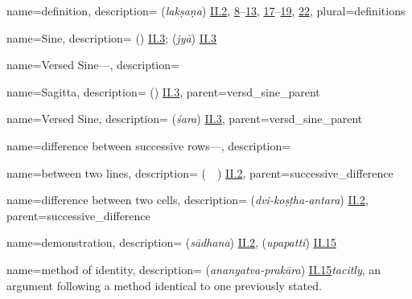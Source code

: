 {
        name={definition},
        description={ (\textit{lakṣaṇa}) \hyperlink{Sii2}{II.2}, \hyperlink{Sii8}{8}--\hyperlink{Sii13}{13}, \hyperlink{Sii17}{17}--\hyperlink{Sii19}{19}, \hyperlink{Sii22}{22}},
        plural={definitions}
}


{
        name={Sine},
        description={ (\jayb) \hyperlink{Pii3}{II.3};  (\textit{jyā}) \hyperlink{Sii3}{II.3}}
}

{
        name={Versed Sine---},
        description={\phantom{x}\nopagebreak}
}

{
        name={Sagitta},
        description={ (\sahm) \hyperlink{Pii3}{II.3}},
        parent={versd_sine_parent}
} 

{
        name={Versed Sine},
        description={ (\textit{śara}) \hyperlink{Sii3}{II.3}},
        parent={versd_sine_parent}
}


{
        name={difference between successive rows---},
        description={\phantom{x}\nopagebreak}
}
  
{
        name={between two lines},
        description={ (\ma\ \bayn\ \alsatrayn) \hyperlink{Pii2}{II.2}},
        parent={successive_difference}
}

{
        name={difference between two cells},
        description={ (\textit{dvi-koṣṭha-antara}) \hyperlink{Sii2}{II.2}},
        parent={successive_difference}
}        

{
        name={demonstration},
        description={ (\textit{sādhana}) \hyperlink{Sii2}{II.2},  (\textit{upapatti}) \hyperlink{Sii15}{II.15}}
}

{
        name={method of identity},
        description={ (\textit{ananyatva-prakāra}) \hyperlink{Sii15}{II.15}\newline \textit{tacitly}, an argument following a method identical to one previously stated.}
}

